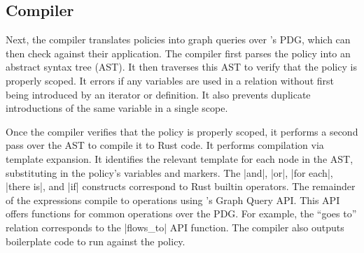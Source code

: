 \subsection{Compiler}

Next, the \syslang{} compiler translates policies into graph queries over \sys{}'s PDG,
which \devs{} can then check against their application.
%
The compiler first parses the policy into an abstract syntax tree (AST).
%
It then traverses this AST to verify that the policy is properly scoped.
%
It errors if any variables are used in a relation without first being introduced by an iterator or definition.
%
It also prevents duplicate introductions of the same variable in a single scope.

Once the compiler verifies that the policy is properly scoped,
it performs a second pass over the AST to compile it to Rust code.
%
It performs compilation via template expansion.
%
It identifies the relevant template for each node in the AST,
substituting in the policy's variables and markers.
%
The |and|, |or|, |for each|, |there is|, and |if| constructs correspond to Rust builtin operators.
%
The remainder of the expressions compile to operations using \sys{}'s Graph Query API.
%
This API offers functions for common operations over the PDG.
%
For example, the ``goes to'' relation corresponds to the |flows_to| \sys{} API function.
%
The compiler also outputs boilerplate code to run \sys{} against the policy.

